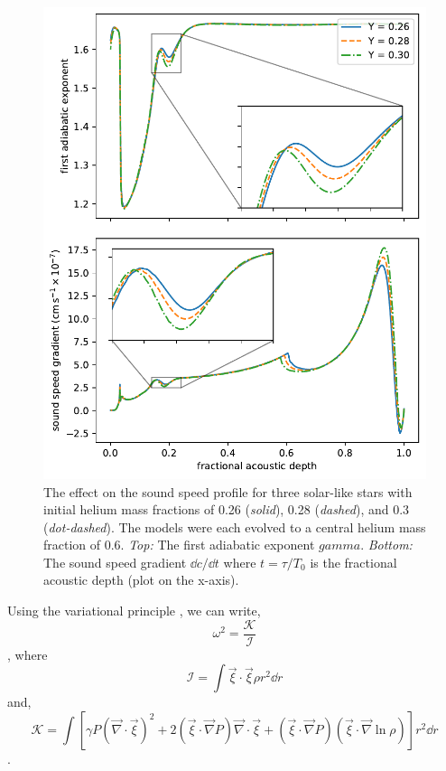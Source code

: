 \begin{figure}
    \centering
    \includegraphics{figures/helium-ionisation-sound-speed.pdf}
    \caption{The effect on the sound speed profile for three solar-like stars with initial helium mass fractions of 0.26 (\emph{solid}), 0.28 (\emph{dashed}), and 0.3 (\emph{dot-dashed}). The models were each evolved to a central helium mass fraction of 0.6. \emph{Top:} The first adiabatic exponent \(gamma\). \emph{Bottom:} The sound speed gradient \(\dd c/\dd t\) where \(t = \tau/T_0\) is the fractional acoustic depth (plot on the x-axis).}
\end{figure}


Using the variational principle \needcite[Chandrasekhar], we can write,
%
\begin{equation}
    \omega^2 = \frac{\mathcal{K}}{\mathcal{I}}
\end{equation}
%
, where 
%
\begin{equation}
    \mathcal{I} = \int \vec{\xi} \cdot \vec{\xi} \rho r^2 \dd r
\end{equation}
%
and,
%
\begin{equation}
    \mathcal{K} = \int \left[\gamma P (\vec{\nabla}\cdot\vec{\xi})^2 + 2(\vec{\xi}\cdot\vec{\nabla} P) \vec{\nabla}\cdot\vec{\xi} + (\vec{\xi}\cdot\vec{\nabla} P) (\vec{\xi}\cdot\vec{\nabla}\ln\rho)\right] r^2 \dd r
\end{equation}
%
.

